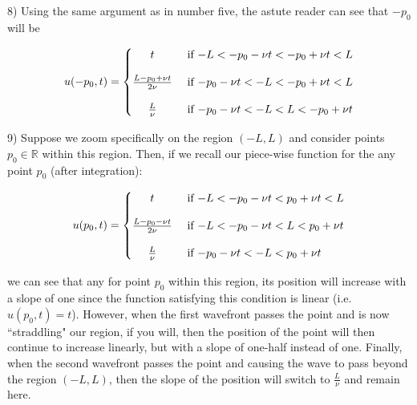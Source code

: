 \documentclass[executivepaper]{article}
\begin{document}
\begin{flushleft}

8) Using the same argument as in number five, the astute reader can see that $-p_{0}$ will be

\begin{center}

\[
 u(-p_{0},t)=
  \begin{cases}
      \hfill t  \hfill & \text{ if $-L < -p_{0}-\nu t < -p_{0}+\nu t < L$} \\[1em]
      
      \hfill \frac{L-p_{0}+\nu t}{2\nu} \hfill & \text{ if $-p_{0}-\nu t <-L < -p_{0}+\nu t < L$} \\[1em]
      
      \hfill \frac{L}{\nu} \hfill & \text{ if $-p_{0}-\nu t < -L < L < -p_{0}+\nu t$}
  \end{cases}
\]


\end{center}

\end{flushleft}

\begin{flushleft}

9) Suppose we zoom specifically on the region $(-L, L)$ and consider points $p_{0} \in \mathbb R$ within this region. Then, if we recall our piece-wise function for the any point $p_{0}$ (after integration):

\begin{center}

\[
 u(p_{0},t)=
  \begin{cases}
      \hfill t  \hfill & \text{ if $-L < -p_{0}-\nu t < p_{0}+\nu t < L$} \\[1em]
      
      \hfill \frac{L-p_{0}-\nu t}{2\nu} \hfill & \text{ if $-L < -p_{0}-\nu t < L < p_{0}+\nu t$} \\[1em]
      
      \hfill \frac{L}{\nu} \hfill & \text{ if $-p_{0}-\nu t < -L < p_{0}+\nu t$}
  \end{cases}
\]

\end{center}

we can see that any for point $p_{0}$ within this region, its position will increase with a slope of one since the function satisfying this condition is linear (i.e. $u(p_{0}, t)=t$). However, when the first wavefront passes the point and is now ``straddling" our region, if you will, then the position of the point will then continue to increase linearly, but with a slope of one-half instead of one. Finally, when the second wavefront passes the point and causing the wave to pass beyond the region $(-L, L)$, then the slope of the position will switch to $\frac{L}{\nu}$ and remain here. 

\end{flushleft}
\end{document}
